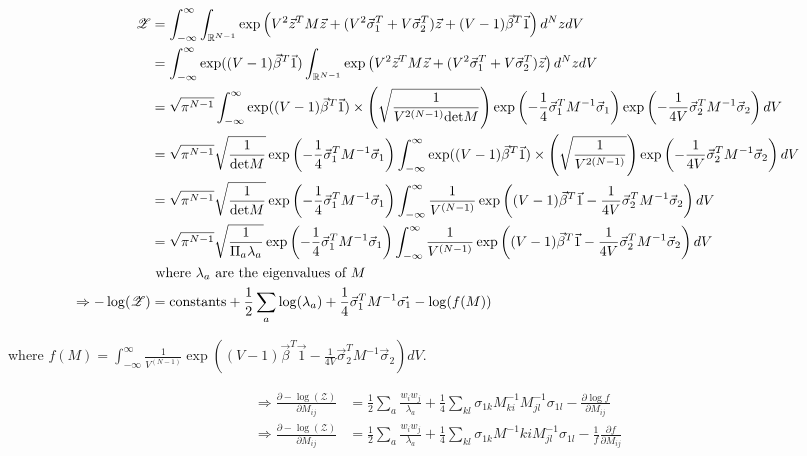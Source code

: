 \documentclass{article}
\newcommand{\z}{\mathscr{Z}}
\begin{document}
\begin{align*}
\z&=\int_{-\infty}^\infty\int_{\R^{N-1}}\exp\left(V^2\vec{z}^TM\vec{z}+(V^2\vec{\sigma}_1^T+V\vec{\sigma}_2^T)\vec{z}+(V-1)\vec{\beta}^T\vec{1}\right)d^NzdV
\\&=\int_{-\infty}^\infty \exp((V-1)\vec{\beta}^T\vec{1})\int_{\R^{N-1}}\exp\left(V^2\vec{z}^TM\vec{z}+(V^2\vec{\sigma}_1^T+V\vec{\sigma}_2^T)\vec{z}\right)d^NzdV
\\&=\sqrt{\pi^{N-1}}\int_{-\infty}^\infty\exp((V-1)\vec{\beta}^T\vec{1})\times\left(\sqrt{\frac{1}{V^{2(N-1)}\det{M}}}\right)\exp\left(-\frac{1}{4}\vec{\sigma}_1^TM^{-1}\vec{\sigma}_1\right)\exp\left(-\frac{1}{4V}\vec{\sigma}_2^TM^{-1}\vec{\sigma}_2\right)dV
\\&=\sqrt{\pi^{N-1}}\sqrt{\frac{1}{\det M}}\exp\left(-\frac{1}{4}\vec{\sigma}_1^TM^{-1}\vec{\sigma}_1\right)\int_{-\infty}^\infty\exp((V-1)\vec{\beta}^T\vec{1})\times\left(\sqrt{\frac{1}{V^{2(N-1)}}}\right)\exp\left(-\frac{1}{4V}\vec{\sigma}_2^TM^{-1}\vec{\sigma}_2\right)dV
\\&=\sqrt{\pi^{N-1}}\sqrt{\frac{1}{\det M}}\exp\left(-\frac{1}{4}\vec{\sigma}_1^TM^{-1}\vec{\sigma}_1\right)\int_{-\infty}^\infty\frac{1}{V^{(N-1)}}\exp\left((V-1)\vec{\beta}^T\vec{1}-\frac{1}{4V}\vec{\sigma}_2^TM^{-1}\vec{\sigma}_2\right)dV
\\&=\sqrt{\pi^{N-1}}\sqrt{\frac{1}{\Pi_a\lambda_a}}\exp\left(-\frac{1}{4}\vec{\sigma}_1^TM^{-1}\vec{\sigma}_1\right)\int_{-\infty}^\infty\frac{1}{V^{(N-1)}}\exp\left((V-1)\vec{\beta}^T\vec{1}-\frac{1}{4V}\vec{\sigma}_2^TM^{-1}\vec{\sigma}_2\right)dV 
\\&\text{ where $\lambda_a$ are the eigenvalues of $M$}
\\ \Rightarrow -\log(\z)&=\text{constants}+\frac{1}{2}\sum_a\log(\lambda_a)+\frac{1}{4}\vec{\sigma}_1^TM^{-1}\vec{\sigma_1}-\log(f(M))
\end{align*}

where $f(M)=\int_{-\infty}^\infty\frac{1}{V^{(N-1)}}\exp\left((V-1)\vec{\beta}^T\vec{1}-\frac{1}{4V}\vec{\sigma}_2^TM^{-1}\vec{\sigma}_2\right)dV $.

\begin{align*}
\Rightarrow\frac{\partial -\log(\z)}{\partial M_{ij}}&=\frac{1}{2}\sum_a\frac{w_iw_j}{\lambda_a}+\frac{1}{4}\sum_{kl}\sigma_{1k}M^{-1}_{ki}M^{-1}_{jl}\sigma_{1l}-\frac{\partial \log f}{\partial M_{ij}}
\\\Rightarrow\frac{\partial -\log(\z)}{\partial M_{ij}}&=\frac{1}{2}\sum_a\frac{w_iw_j}{\lambda_a}+\frac{1}{4}\sum_{kl}\sigma_{1k}M^{-1}{ki}M^{-1}_{jl}\sigma_{1l}-\frac{1}{f}\frac{\partial f}{\partial M_{ij}}
\end{align*}
\end{document}
